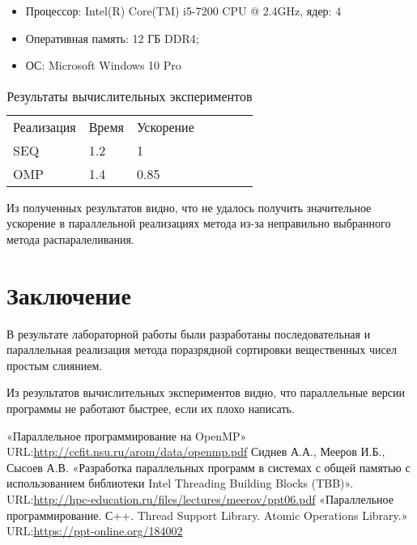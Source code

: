 \documentclass{report}
\begin{document}
    \begin{itemize}
        \item Процессор: Intel(R) Core(TM) i5-7200 CPU @ 2.4GHz, ядер: 4
        \item Оперативная память: 12 ГБ DDR4;
        \item ОС: Microsoft Windows 10 Pro
    \end{itemize}

    \begin{table}[!h]
        \begin{center}
            \begin{tabular}{l l l l l l l}
                Реализация & Время & Ускорение   \\
                SEQ        & 1.2 & 1           \\
                OMP        & 1.4 & 0.85      \\


            \end{tabular}
        \end{center}
        \caption{Результаты вычислительных экспериментов}
        \centering
    \end{table}

    \par Из полученных результатов видно, что не удалось получить значительное ускорение в параллельной реализациях метода из-за неправильно выбранного метода распаралеливания.
    \newpage

    \section*{Заключение}
    В результате лабораторной работы были разработаны последовательная и параллельная реализация метода поразрядной сортировки вещественных чисел простым слиянием.
    \par Из результатов вычислительных экспериментов видно, что параллельные версии программы не работают быстрее, если их плохо написать.
    \newpage

    \begin{thebibliography}{1}
        \bibitem{} «Параллельное программирование на OpenMP»
        \\URL:\url {http://ccfit.nsu.ru/arom/data/openmp.pdf}
  Сиднев А.А., Мееров И.Б., Сысоев А.В. «Разработка параллельных программ в системах с общей памятью с использованием библиотеки Intel Threading Building Blocks (TBB)».
        \\URL:\url {http://hpc-education.ru/files/lectures/meerov/ppt06.pdf}
 \bibitem{} «Параллельное программирование. С++. Thread Support Library. Atomic Operations Library.»
        \\URL:\url {https://ppt-online.org/184002}
 \end{thebibliography}
    \newpage
\end{document}
